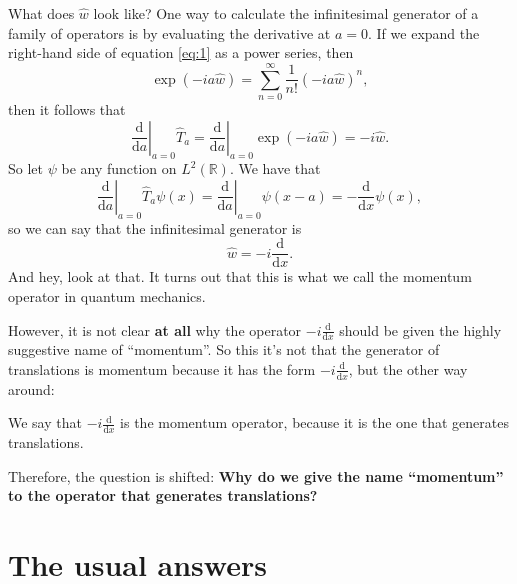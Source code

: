 \documentclass[11pt,a4]{article}
\newcommand{\de}{\mathrm{d}}
\newcommand{\tdev}[2]{\frac{\de #1}{\de #2}}
\newcommand{\tdevzero}[1]{\left.\tdev{}{#1}\right\vert_{#1 = 0}}
\begin{document}
What does $\hat{w}$ look like? One way to calculate the infinitesimal generator of a family of operators is
by evaluating the derivative at $a=0$. If we expand the right-hand side of equation \ref{eq:1} as a power series, then
\begin{equation}
  \label{eq:3}
  \exp\left(-ia\hat{w}\right) = \sum_{n=0}^{\infty}\frac{1}{n!}(-ia\hat{w})^n,
\end{equation}
then it follows that
\begin{equation}
  \label{eq:4}
  \tdevzero{a}\hat{T}_a = \tdevzero{a} \exp\left(-ia\hat{w}\right) = -i\hat{w}.
\end{equation}
So let $\psi$ be any function on $L^2(\mathbb{R})$. We have that
\begin{equation}
  \tdevzero{a}\hat{T}_a\psi(x) = \tdevzero{a}\psi(x-a) = -\tdev{}{x}\psi(x),
\end{equation}
so we can say that the infinitesimal generator is
\begin{equation}
  \label{eq:5}
  \hat{w} = -i\tdev{}{x}.
\end{equation}
And hey, look at that. It turns out that this is what we call the momentum operator in quantum mechanics.

However, it is not clear \textbf{at all} why the operator $-i\tdev{}{x}$ should be given the highly suggestive name of ``momentum''. So
this it's not that the generator of translations is momentum because it has
the form $-i\tdev{}{x}$, but the other way around:

We say that $-i\tdev{}{x}$ is the momentum operator, because it is the one that generates translations.

Therefore, the question is shifted: \textbf{Why do we give the name ``momentum'' to the operator that generates translations?}

\section*{The usual answers}
\label{sec:first-answer}
\end{document}
